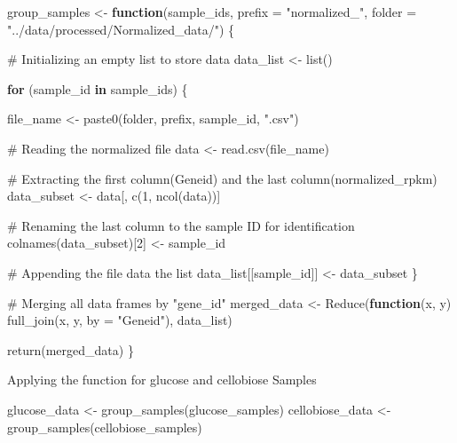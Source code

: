 \documentclass[
  letterpaper,
  DIV=11,
  numbers=noendperiod]{scrartcl}
\newenvironment{Shaded}{\begin{snugshade}}{\end{snugshade}}
\newcommand{\AttributeTok}[1]{\textcolor[rgb]{0.40,0.45,0.13}{#1}}
\newcommand{\CommentTok}[1]{\textcolor[rgb]{0.37,0.37,0.37}{#1}}
\newcommand{\ControlFlowTok}[1]{\textcolor[rgb]{0.00,0.23,0.31}{\textbf{#1}}}
\newcommand{\DecValTok}[1]{\textcolor[rgb]{0.68,0.00,0.00}{#1}}
\newcommand{\FunctionTok}[1]{\textcolor[rgb]{0.28,0.35,0.67}{#1}}
\newcommand{\NormalTok}[1]{\textcolor[rgb]{0.00,0.23,0.31}{#1}}
\newcommand{\OtherTok}[1]{\textcolor[rgb]{0.00,0.23,0.31}{#1}}
\newcommand{\StringTok}[1]{\textcolor[rgb]{0.13,0.47,0.30}{#1}}
\begin{document}
\begin{Shaded}
\begin{Highlighting}[]
\NormalTok{group\_samples }\OtherTok{\textless{}{-}} \ControlFlowTok{function}\NormalTok{(sample\_ids, }\AttributeTok{prefix =} \StringTok{"normalized\_"}\NormalTok{, }
                          \AttributeTok{folder =} \StringTok{"../data/processed/Normalized\_data/"}\NormalTok{) \{}
  
  \CommentTok{\# Initializing an empty list to store data}
\NormalTok{  data\_list }\OtherTok{\textless{}{-}} \FunctionTok{list}\NormalTok{()}
  
  \ControlFlowTok{for}\NormalTok{ (sample\_id }\ControlFlowTok{in}\NormalTok{ sample\_ids) \{}
    
\NormalTok{    file\_name }\OtherTok{\textless{}{-}} \FunctionTok{paste0}\NormalTok{(folder, prefix, sample\_id, }\StringTok{".csv"}\NormalTok{)}
    
    \CommentTok{\# Reading the normalized file}
\NormalTok{    data }\OtherTok{\textless{}{-}} \FunctionTok{read.csv}\NormalTok{(file\_name)}
    
    \CommentTok{\# Extracting the first column(Geneid) and the last column(normalized\_rpkm)}
\NormalTok{    data\_subset }\OtherTok{\textless{}{-}}\NormalTok{ data[, }\FunctionTok{c}\NormalTok{(}\DecValTok{1}\NormalTok{, }\FunctionTok{ncol}\NormalTok{(data))]  }
    
    \CommentTok{\# Renaming the last column to the sample ID for identification}
    \FunctionTok{colnames}\NormalTok{(data\_subset)[}\DecValTok{2}\NormalTok{] }\OtherTok{\textless{}{-}}\NormalTok{ sample\_id}
    
    \CommentTok{\# Appending the file data the list}
\NormalTok{    data\_list[[sample\_id]] }\OtherTok{\textless{}{-}}\NormalTok{ data\_subset}
\NormalTok{  \}}
  
  \CommentTok{\# Merging all data frames by "gene\_id"}
\NormalTok{  merged\_data }\OtherTok{\textless{}{-}} \FunctionTok{Reduce}\NormalTok{(}\ControlFlowTok{function}\NormalTok{(x, y) }\FunctionTok{full\_join}\NormalTok{(x, y, }\AttributeTok{by =} \StringTok{"Geneid"}\NormalTok{), data\_list)}
  
  \FunctionTok{return}\NormalTok{(merged\_data)}
\NormalTok{\}}
\end{Highlighting}
\end{Shaded}

Applying the function for glucose and cellobiose Samples

\begin{Shaded}
\begin{Highlighting}[]
\NormalTok{glucose\_data }\OtherTok{\textless{}{-}} \FunctionTok{group\_samples}\NormalTok{(glucose\_samples)}
\NormalTok{cellobiose\_data }\OtherTok{\textless{}{-}} \FunctionTok{group\_samples}\NormalTok{(cellobiose\_samples)}
\end{Highlighting}
\end{Shaded}
\end{document}
